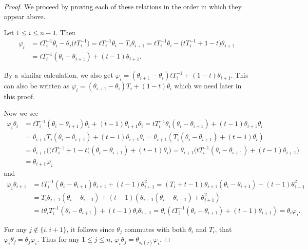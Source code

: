 \documentclass[10pt,a4paper]{amsart}
\numberwithin{equation}{section}
\theoremstyle{definition}
\begin{document}
\begin{proof}
We proceed by proving each of these relations in the order in which they appear above.

 Let $1 \leq i \leq n-1$. Then
\begin{align*}
 \varphi_i &= tT_i^{-1}\theta_i - \theta_i\bigl(tT_i^{-1}\bigr) = tT_i^{-1}\theta_i - T_i\theta_{i+1} = tT_i^{-1}\theta_i - \bigl(tT_i^{-1}+1-t\bigr)\theta_{i+1}\\
 &= tT_i^{-1}(\theta_i - \theta_{i+1}) + (t-1)\theta_{i+1}.
\end{align*}

By a~similar calculation, we also get
$ \varphi_i = (\theta_{i+1}-\theta_i)tT_i^{-1} + (1-t)\theta_{i+1}$.
This can also be written as
$ \varphi_i = (\theta_{i+1}-\theta_i)T_i + (1-t)\theta_i
$
which we need later in this proof.

Now we see
\begin{align*}
 \varphi_i\theta_i &= tT_i^{-1}(\theta_i-\theta_{i+1})\theta_i + (t-1)\theta_{i+1}\theta_i = tT_i^{-1}\theta_i(\theta_i-\theta_{i+1}) + (t-1)\theta_{i+1}\theta_i \\
 & = \theta_{i+1}T_i(\theta_i -\theta_{i+1}) + (t-1)\theta_{i+1}\theta_i
 = \theta_{i+1}( T_i(\theta_i-\theta_{i+1}) + (t-1)\theta_i ) \\
 & = \theta_{i+1}\bigl( \bigl(tT_i^{-1} + 1-t\bigr)(\theta_i -\theta_{i+1}) + (t-1)\theta_i \bigr) = \theta_{i+1} \bigl( tT_i^{-1}(\theta_i -\theta_{i+1}) + (t-1)\theta_{i+1}\bigr) \\
&= \theta_{i+1}\varphi_i
\end{align*}
and
\begin{align*}
 \varphi_i\theta_{i+1} &= tT_i^{-1}(\theta_i - \theta_{i+1})\theta_{i+1}+(t-1)\theta_{i+1}^{2} = (T_i+t-1)\theta_{i+1}(\theta_i-\theta_{i+1}) + (t-1)\theta_{i+1}^2 \\
 & = T_i\theta_{i+1}(\theta_i-\theta_{i+1}) + (t-1)\left( \theta_{i+1}(\theta_i-\theta_{i+1})+\theta_{i+1}^2 \right) \\
 &= t\theta_iT_i^{-1}(\theta_i - \theta_{i+1}) +(t-1)\theta_i\theta_{i+1} = \theta_i\left( tT_i^{-1}(\theta_i-\theta_{i+1}) +(t-1)\theta_{i+1} \right) = \theta_i\varphi_i.
\end{align*}

For any $j \notin \{i,i+1\}$, it follows since $\theta_j$ commutes with both $\theta_i$ and $T_i$, that
$
 \varphi_i\theta_j = \theta_j \varphi_i$.
Thus for any $1\leq j \leq n$,
$
 \varphi_i\theta_j = \theta_{s_i(j)}\varphi_i$.



\end{proof}
\end{document}
